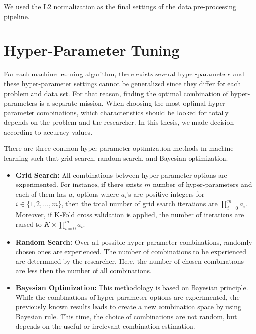 We used the L2 normalization as the final settings of the data pre-processing pipeline.

\newpage

\section{Hyper-Parameter Tuning}

For each machine learning algorithm, there exists several hyper-parameters and these hyper-parameter settings cannot be generalized since they differ for each problem and data set. For that reason, finding the optimal combination of hyper-parameters is a separate mission. When choosing the most optimal hyper-parameter combinations, which characteristics should be looked for totally depends on the problem and the researcher. In this thesis, we made decision according to accuracy values.

There are three common hyper-parameter optimization methods in machine learning such that grid search, random search, and Bayesian optimization.

\begin{itemize}
	
	\item \textbf{Grid Search:} All combinations between hyper-parameter options are experimented. For instance, if there exists $m$ number of hyper-parameters and each of them has $a_{i}$ options where $a_{i}$'s are positive integers for $i \in \{1,2,\dots,m\}$, then the total number of grid search iterations are $\prod_{i=0}^{m} a_{i}$. Moreover, if K-Fold cross validation is applied, the number of iterations are raised to $K \times \prod_{i=0}^{m} a_{i}$.
	
	\item \textbf{Random Search:} Over all possible hyper-parameter combinations, randomly chosen ones are experienced. The number of combinations to be experienced are determined by the researcher. Here, the number of chosen combinations are less then the number of all combinations.
	
	\item \textbf{Bayesian Optimization:} This methodology is based on Bayesian principle. While the combinations of hyper-parameter options are experimented, the previously known results leads to create a new combination space by using Bayesian rule. This time, the choice of combinations are not random, but depends on the useful or irrelevant combination estimation.
	
\end{itemize}

